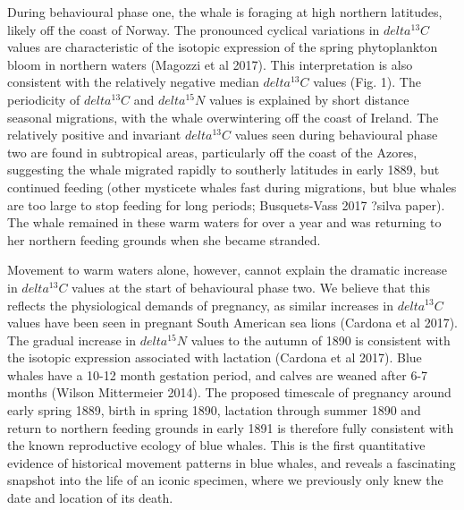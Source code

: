 \documentclass[a4paper,12pt]{article}
\begin{document}
During behavioural phase one, the whale is foraging at high northern latitudes, likely off the coast of Norway. 
The pronounced cyclical variations in $delta^13C$ values are characteristic of the isotopic expression of the spring phytoplankton bloom in northern waters (Magozzi et al 2017). 
This interpretation is also consistent with the relatively negative median $delta^13C$ values (Fig. 1). 
The periodicity of $delta^13C$ and $delta^15N$ values is explained by short distance seasonal migrations, with the whale overwintering off the coast of Ireland. 
The relatively positive and invariant $delta^13C$ values seen during behavioural phase two are found in subtropical areas, particularly off the coast of the Azores, suggesting the whale migrated rapidly to southerly latitudes in early 1889, but continued feeding (other mysticete whales fast during migrations, but blue whales are too large to stop feeding for long periods; Busquets-Vass 2017 ?silva paper). 
The whale remained in these warm waters for over a year and was returning to her northern feeding grounds when she became stranded. 
 
Movement to warm waters alone, however, cannot explain the dramatic increase in $delta^13C$ values at the start of behavioural phase two. 
We believe that this reflects the physiological demands of pregnancy, as similar increases in $delta^13C$ values have been seen in pregnant South American sea lions (Cardona et al 2017). 
The gradual increase in $delta^15N$ values to the autumn of 1890 is consistent with the isotopic expression associated with lactation (Cardona et al 2017). Blue whales have a 10-12 month gestation period, and calves are weaned after 6-7 months (Wilson  Mittermeier 2014). 
The proposed timescale of pregnancy around early spring 1889, birth in spring 1890, lactation through summer 1890 and return to northern feeding grounds in early 1891 is therefore fully consistent with the known reproductive ecology of blue whales. 
This is the first quantitative evidence of historical movement patterns in blue whales, and reveals a fascinating snapshot into the life of an iconic specimen, where we previously only knew the date and location of its death. 
 
\end{document}

